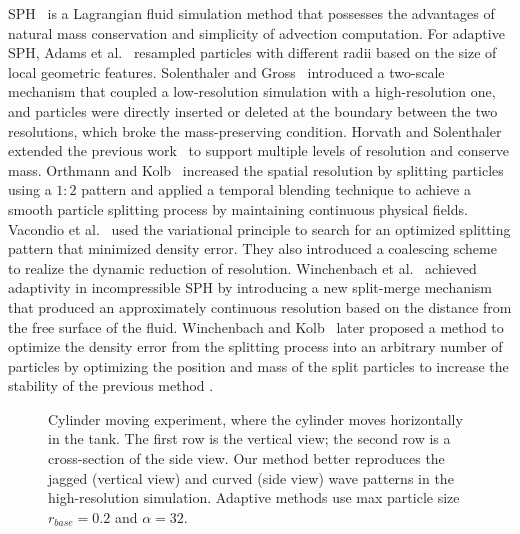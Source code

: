 \documentclass[VANCOUVER,STIX1COL]{WileyNJD-v2}
\begin{document}
SPH~\cite{Koschier19} is a Lagrangian fluid simulation method that possesses the advantages of natural mass conservation and simplicity of advection computation. For adaptive SPH, Adams et al.~\cite{Adams07} resampled particles with different radii based on the size of local geometric features. Solenthaler and Gross~\cite{Solenthaler11} introduced a two-scale mechanism that coupled a low-resolution simulation with a high-resolution one, and particles were directly inserted or deleted at the boundary between the two resolutions, which broke the mass-preserving condition. Horvath and Solenthaler~\cite{Horvath13} extended the previous work~\cite{Solenthaler11} to support multiple levels of resolution and conserve mass. Orthmann and Kolb~\cite{Orthmann12} increased the spatial resolution by splitting particles using a $1:2$ pattern and applied a temporal blending technique to achieve a smooth particle splitting process by maintaining continuous physical fields. Vacondio et al.~\cite{Vacondio16} used the variational principle to search for an optimized splitting pattern that minimized density error. They also introduced a coalescing scheme to realize the dynamic reduction of resolution. Winchenbach et al.~\cite{Winchenbach17} achieved adaptivity in incompressible SPH by introducing a new split-merge mechanism that produced an approximately continuous resolution based on the distance from the free surface of the fluid. Winchenbach and Kolb~\cite{Winchenbach21} later proposed a method to optimize the density error from the splitting process into an arbitrary number of particles by optimizing the position and mass of the split particles to increase the stability of the previous method \cite{Winchenbach17}.

\begin{figure}[t]

\centering
{}

\setcounter{subfigure}{0}
\vspace{-0.7\baselineskip}
\caption{
Cylinder moving experiment, where the cylinder moves horizontally in the tank. The first row is the vertical view; the second row is a cross-section of the side view. Our method better reproduces the jagged (vertical view) and curved (side view) wave patterns in the high-resolution simulation. Adaptive methods use max particle size $r_{base} = 0.2$ and $\alpha = 32$.
}
\label{fig:rod}

\end{figure}
\end{document}

